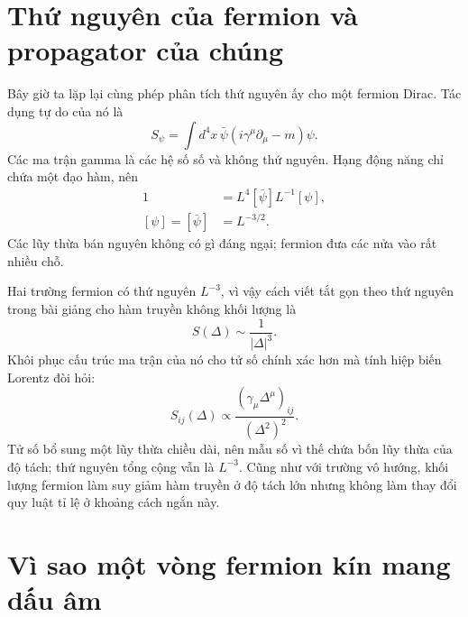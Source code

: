 \section{Thứ nguyên của fermion và propagator của chúng}

Bây giờ ta lặp lại cùng phép phân tích thứ nguyên ấy cho một fermion Dirac. Tác dụng tự do của nó là
\begin{equation}
S_\psi=\int d^4x\,
\bar\psi\left(i\gamma^\mu\partial_\mu-m\right)\psi.
\end{equation}
Các ma trận gamma là các hệ số số và không thứ nguyên. Hạng động năng chỉ chứa một đạo hàm, nên
\begin{align}
1
&=L^4[\bar\psi]L^{-1}[\psi],\\
[\psi]=[\bar\psi]&=L^{-3/2}.
\end{align}
Các lũy thừa bán nguyên không có gì đáng ngại; fermion đưa các nửa vào rất nhiều chỗ.

\begin{classroomqa}
\end{classroomqa}

Hai trường fermion có thứ nguyên \(L^{-3}\), vì vậy cách viết tắt gọn theo thứ nguyên trong bài giảng cho hàm truyền không khối lượng là
\begin{equation}
S(\Delta)\sim\frac{1}{|\Delta|^3}.
\end{equation}
Khôi phục cấu trúc ma trận của nó cho tử số chính xác hơn mà tính hiệp biến Lorentz đòi hỏi:
\begin{equation}
S_{ij}(\Delta)
\propto
\frac{\left(\gamma_\mu\Delta^\mu\right)_{ij}}
{\left(\Delta^2\right)^2}.
\end{equation}
Tử số bổ sung một lũy thừa chiều dài, nên mẫu số vì thế chứa bốn lũy thừa của độ tách; thứ nguyên tổng cộng vẫn là \(L^{-3}\). Cũng như với trường vô hướng, khối lượng fermion làm suy giảm hàm truyền ở độ tách lớn nhưng không làm thay đổi quy luật tỉ lệ ở khoảng cách ngắn này.

\section{Vì sao một vòng fermion kín mang dấu âm}

